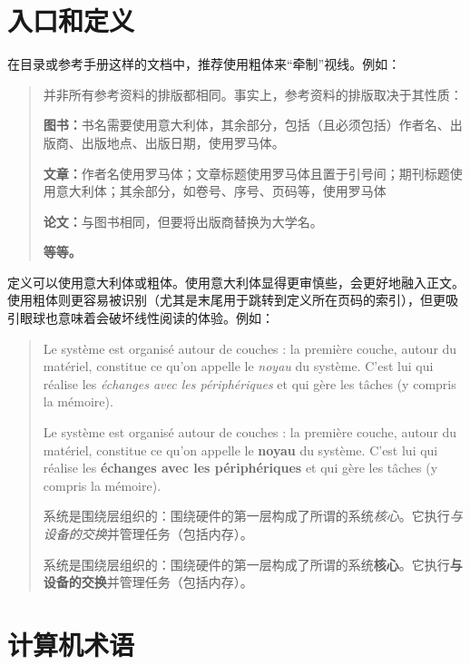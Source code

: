 \section{入口和定义}

在目录或参考手册这样的文档中，推荐使用粗体来``牵制''视线。例如：

\begin{quote}
    并非所有参考资料的排版都相同。事实上，参考资料的排版取决于其性质：

    \textbf{图书：}书名需要使用意大利体，其余部分，包括（且必须包括）作者名、出版商、出版地点、出版日期，使用罗马体。
    
    \textbf{文章：}作者名使用罗马体；文章标题使用罗马体且置于引号间；期刊标题使用意大利体；其余部分，如卷号、序号、页码等，使用罗马体

    \textbf{论文：}与图书相同，但要将出版商替换为大学名。

    \textbf{等等。}
\end{quote}

定义可以使用意大利体或粗体。使用意大利体显得更审慎些，会更好地融入正文。使用粗体则更容易被识别（尤其是末尾用于跳转到定义所在页码的索引），但更吸引眼球也意味着会破坏线性阅读的体验。例如：

\begin{quote}
    Le système est organisé autour de couches : la première couche, autour du matériel, constitue ce qu'on appelle le \emph{noyau} du système. C'est lui qui réalise les \emph{échanges avec les périphériques} et qui gère les tâches (y compris la mémoire).

    Le système est organisé autour de couches : la première couche, autour du matériel, constitue ce qu'on appelle le \textbf{noyau} du système. C'est lui qui réalise les \textbf{échanges avec les périphériques} et qui gère les tâches (y compris la mémoire).

    \begin{bil}
        系统是围绕层组织的：围绕硬件的第一层构成了所谓的系统\emph{核心}。它执行\emph{与设备的交换}并管理任务（包括内存）。

        系统是围绕层组织的：围绕硬件的第一层构成了所谓的系统\textbf{核心}。它执行\textbf{与设备的交换}并管理任务（包括内存）。
    \end{bil}
\end{quote}

\section{计算机术语}

